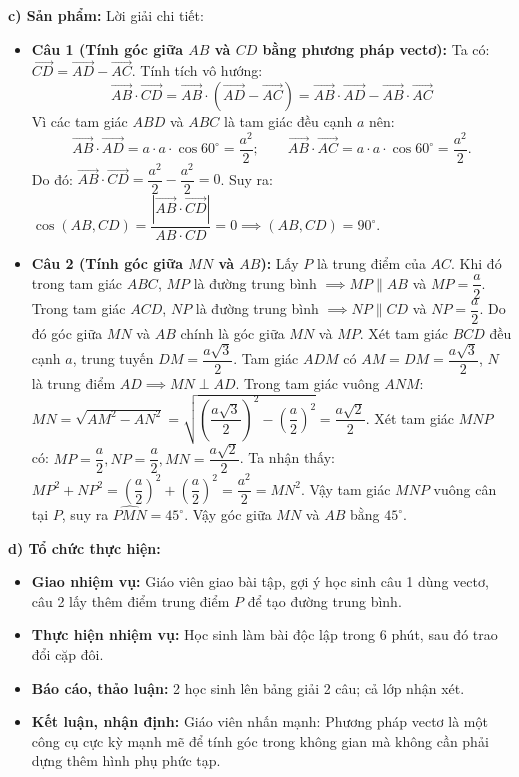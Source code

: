 \documentclass[12pt, a4paper]{article}
\renewcommand{\vec}[1]{\overrightarrow{#1}}
\begin{document}
\noindent \textbf{c) Sản phẩm:}
Lời giải chi tiết:
\begin{itemize}
    \item \textbf{Câu 1 (Tính góc giữa $AB$ và $CD$ bằng phương pháp vectơ):}
    Ta có: $\vec{CD} = \vec{AD} - \vec{AC}$.
    Tính tích vô hướng:
    $$\vec{AB} \cdot \vec{CD} = \vec{AB} \cdot (\vec{AD} - \vec{AC}) = \vec{AB} \cdot \vec{AD} - \vec{AB} \cdot \vec{AC}$$
    Vì các tam giác $ABD$ và $ABC$ là tam giác đều cạnh $a$ nên:
    $$\vec{AB} \cdot \vec{AD} = a \cdot a \cdot \cos 60^\circ = \dfrac{a^2}{2}; \qquad \vec{AB} \cdot \vec{AC} = a \cdot a \cdot \cos 60^\circ = \dfrac{a^2}{2}.$$
    Do đó: $\vec{AB} \cdot \vec{CD} = \dfrac{a^2}{2} - \dfrac{a^2}{2} = 0$.
    Suy ra: $\cos(AB, CD) = \dfrac{|\vec{AB} \cdot \vec{CD}|}{AB \cdot CD} = 0 \implies (AB, CD) = 90^\circ$.
    \item \textbf{Câu 2 (Tính góc giữa $MN$ và $AB$):}
    Lấy $P$ là trung điểm của $AC$. Khi đó trong tam giác $ABC$, $MP$ là đường trung bình $\implies MP \parallel AB$ và $MP = \dfrac{a}{2}$.
    Trong tam giác $ACD$, $NP$ là đường trung bình $\implies NP \parallel CD$ và $NP = \dfrac{a}{2}$.
    Do đó góc giữa $MN$ và $AB$ chính là góc giữa $MN$ và $MP$.
    Xét tam giác $BCD$ đều cạnh $a$, trung tuyến $DM = \dfrac{a\sqrt{3}}{2}$.
    Tam giác $ADM$ có $AM = DM = \dfrac{a\sqrt{3}}{2}$, $N$ là trung điểm $AD \implies MN \perp AD$.
    Trong tam giác vuông $ANM$: $MN = \sqrt{AM^2 - AN^2} = \sqrt{\left(\dfrac{a\sqrt{3}}{2}\right)^2 - \left(\dfrac{a}{2}\right)^2} = \dfrac{a\sqrt{2}}{2}$.
    Xét tam giác $MNP$ có: $MP = \dfrac{a}{2}, NP = \dfrac{a}{2}, MN = \dfrac{a\sqrt{2}}{2}$.
    Ta nhận thấy: $MP^2 + NP^2 = \left(\dfrac{a}{2}\right)^2 + \left(\dfrac{a}{2}\right)^2 = \dfrac{a^2}{2} = MN^2$.
    Vậy tam giác $MNP$ vuông cân tại $P$, suy ra $\widehat{PMN} = 45^\circ$.
    Vậy góc giữa $MN$ và $AB$ bằng $45^\circ$.
\end{itemize}

\noindent \textbf{d) Tổ chức thực hiện:}
\begin{itemize}[leftmargin=0.6cm]
    \item \textbf{Giao nhiệm vụ:} Giáo viên giao bài tập, gợi ý học sinh câu 1 dùng vectơ, câu 2 lấy thêm điểm trung điểm $P$ để tạo đường trung bình.
    \item \textbf{Thực hiện nhiệm vụ:} Học sinh làm bài độc lập trong 6 phút, sau đó trao đổi cặp đôi.
    \item \textbf{Báo cáo, thảo luận:} 2 học sinh lên bảng giải 2 câu; cả lớp nhận xét.
    \item \textbf{Kết luận, nhận định:} Giáo viên nhấn mạnh: Phương pháp vectơ là một công cụ cực kỳ mạnh mẽ để tính góc trong không gian mà không cần phải dựng thêm hình phụ phức tạp.
\end{itemize}
\end{document}
